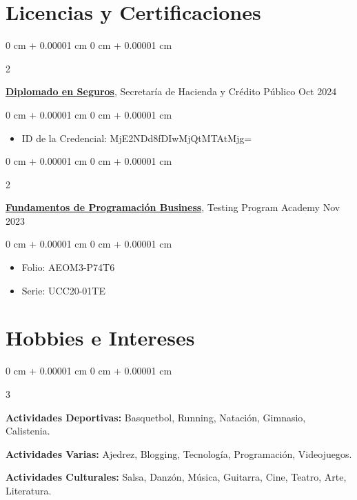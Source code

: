 \documentclass[10pt, letterpaper]{article}
\newenvironment{highlights}{
    \begin{itemize}[
        topsep=0.10 cm,
        parsep=0.10 cm,
        partopsep=0pt,
        itemsep=0pt,
        leftmargin=0 cm + 10pt
    ]
}{
    \end{itemize}
} %
\newenvironment{onecolentry}{
    \begin{adjustwidth}{
        0 cm + 0.00001 cm
    }{
        0 cm + 0.00001 cm
    }
}{
    \end{adjustwidth}
} %
\newenvironment{twocolentry}[2][]{
    \onecolentry
    \def\secondColumn{#2}
    \setcolumnwidth{\fill, 4.5 cm}
    \begin{paracol}{2}
}{
    \switchcolumn \raggedleft \secondColumn
    \end{paracol}
    \endonecolentry
} %
\newenvironment{threecolentry}[3][]{
    \onecolentry
    \def\thirdColumn{#3}
    \setcolumnwidth{, \fill, 4.5 cm}
    \begin{paracol}{3}
    {\raggedright #2} \switchcolumn
}{
    \switchcolumn \raggedleft \thirdColumn
    \end{paracol}
    \endonecolentry
} %
\begin{document}
 \section{Licencias y Certificaciones}

        \begin{twocolentry}{
            Oct 2024
        }
            \href{https://diplomadoenseguros.condusef.gob.mx/qr_verifica.php?ida=21647&idg=3}{\textbf{Diplomado en Seguros}}, Secretaría de Hacienda y Crédito Público\end{twocolentry}

        \vspace{0.10 cm}
        \begin{onecolentry}
            \begin{highlights}
                \item ID de la Credencial: MjE2NDd8fDIwMjQtMTAtMjg=
            \end{highlights}
        \end{onecolentry}

        \begin{twocolentry}{
            Nov 2023
        }
            \href{https://testingprogram.com.mx/validar/}{\textbf{Fundamentos de Programación Business}}, Testing Program Academy\end{twocolentry}

        \vspace{0.10 cm}
        \begin{onecolentry}
            \begin{highlights}
                \item Folio: AEOM3-P74T6
                \item Serie: UCC20-01TE
            \end{highlights}
        \end{onecolentry}

 \section{Hobbies e Intereses}

\begin{threecolentry}{
    \textbf{Actividades Deportivas:} Basquetbol, Running, Natación, Gimnasio, Calistenia.
}{
    \textbf{Actividades Culturales:} Salsa, Danzón, Música, Guitarra, Cine, Teatro, Arte, Literatura. 
}{
    \textbf{Actividades Varias:} Ajedrez, Blogging, Tecnología, Programación, Videojuegos.
}
\end{threecolentry}
\end{document}
